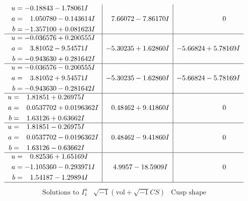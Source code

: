 \documentclass[1p]{elsarticle_modified}
\theoremstyle{definition}
\newcommand{\I}{\sqrt{-1}}
\begin{document}
$$\begin{array}{c|c|c}
\begin{aligned}
u &= -0.18843 - 1.78061 I \\
a &= \phantom{-}1.050780 - 0.143614 I \\
b &= -1.357100 + 0.081623 I\end{aligned}
 & \phantom{-}7.66072 - 7.86170 I & \phantom{-0.000000 } 0 \\ \hline\begin{aligned}
u &= -0.036576 + 0.200555 I \\
a &= \phantom{-}3.81052 - 9.54571 I \\
b &= -0.943630 + 0.281642 I\end{aligned}
 & -5.30235 + 1.62860 I & -5.66824 + 5.78169 I \\ \hline\begin{aligned}
u &= -0.036576 - 0.200555 I \\
a &= \phantom{-}3.81052 + 9.54571 I \\
b &= -0.943630 - 0.281642 I\end{aligned}
 & -5.30235 - 1.62860 I & -5.66824 - 5.78169 I \\ \hline\begin{aligned}
u &= \phantom{-}1.81851 + 0.26975 I \\
a &= \phantom{-}0.0537702 + 0.0196362 I \\
b &= \phantom{-}1.63126 + 0.63662 I\end{aligned}
 & \phantom{-}0.48462 + 9.41860 I & \phantom{-0.000000 } 0 \\ \hline\begin{aligned}
u &= \phantom{-}1.81851 - 0.26975 I \\
a &= \phantom{-}0.0537702 - 0.0196362 I \\
b &= \phantom{-}1.63126 - 0.63662 I\end{aligned}
 & \phantom{-}0.48462 - 9.41860 I & \phantom{-0.000000 } 0 \\ \hline\begin{aligned}
u &= \phantom{-}0.82536 + 1.65169 I \\
a &= -1.105360 - 0.293971 I \\
b &= \phantom{-}1.54187 - 1.29894 I\end{aligned}
 & \phantom{-}4.9957 - 18.5909 I & \phantom{-0.000000 } 0\\
 \hline 
 \end{array}$$\newpage$$\begin{array}{c|c|c}  
\text{Solutions to }I^u_{1}& \I (\text{vol} + \sqrt{-1}CS) & \text{Cusp shape}\\
 \hline 
\begin{aligned}

\end{aligned}
\end{array}$$
\end{document}
